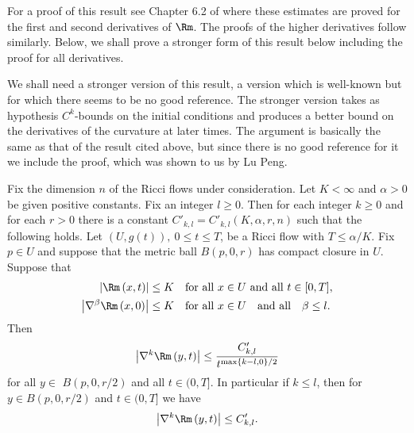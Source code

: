 For a proof of this result see Chapter 6.2 of \cite{ChowLuNi} where
these estimates are proved for the first and second derivatives of
$\Rm$. The proofs of the higher derivatives follow similarly.  Below, we
shall prove a stronger form of this result below including the proof
for all derivatives.

We shall need a stronger version of this result, a version which is
well-known but for which there seems to be no good reference. The
stronger version takes as hypothesis $C^k$-bounds on the
initial conditions and produces a better bound on the derivatives of
the curvature at later times. The argument is basically the same as
that of the result cited above, but since there is no good reference
for it we include the proof, which was shown to us by Lu Peng.





\begin{theorem}\label{thm:shi-with-initial-derivatives}
\label{shiw/deriv}

Fix the dimension $n$ of the Ricci flows under consideration. Let
$K<\infty$ and $\alpha>0$ be given positive constants. Fix an
integer $l\ge 0$. Then for each integer $k\ge 0$ and for each $r>0$
there is a constant $C'_{k,l}=C'_{k,l}(K,\alpha,r,n)$ such that the
following holds. Let $(U,g(t)),\ 0\le t\le T$, be a Ricci flow with
$T\le \alpha/K$. Fix $p\in U$ and suppose that the metric ball
$B(p,0,r)$ has compact closure in $U$. Suppose that
\begin{eqnarray*}
\left\vert \Rm\left(  x,t\right)  \right\vert  &
\leq K\ \ \text{ for all }x\in U\text{ and all}\  t\in[0,T],\\
\left\vert \nabla^{\beta}\Rm\left(  x,0\right)
\right\vert  & \leq K\ \ \text{ for all }x\in U\ \ \text{ and all }\
\ \beta\leq l.
\end{eqnarray*}
Then
\[
\left\vert \nabla^{k}\Rm\left(  y,t\right)
\right\vert
\leq\frac{C'_{k,l}}{t^{\max\left\{  k-l,0\right\}  /2}}%
\]
for all $y\in$ $B(p,0,r/2)  $ and all $t\in(0,T].$ In particular if
$k\leq l$, then for $y\in B(p,0,r/2)$ and $t\in (0,T]$ we have
\[
\left\vert \nabla^{k}\Rm\left(  y,t\right)
\right\vert \leq C_{k,l}'.
\]
\end{theorem}


